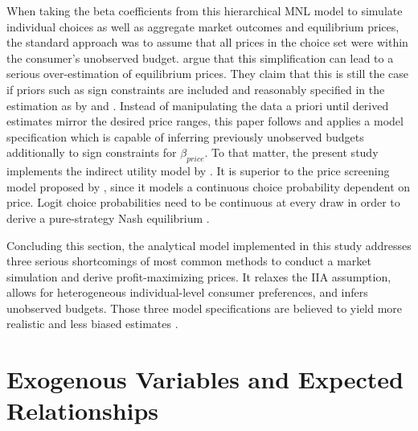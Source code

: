 \documentclass[12pt,a4paper]{article}
\begin{document}
When taking the beta coefficients from this hierarchical MNL model to simulate individual choices as well as aggregate market outcomes and equilibrium prices,
the standard approach was to assume that all prices in the choice set were within the consumer's unobserved budget.
\cite{pachaliPerilsIgnoringBudget2017} argue that this simplification can lead to a serious over-estimation of equilibrium prices.
They claim that this is still the case if priors such as sign constraints are included and reasonably specified in the estimation as by \cite{sonnierHeterogeneityDistributionsWillingnesstopay2007} and \cite{allenbyEconomicValuationProduct2014}.
Instead of manipulating the data a priori until derived estimates mirror the desired price ranges, this paper follows \cite{pachaliPerilsIgnoringBudget2017}
and applies a model specification which is capable of inferring previously unobserved budgets additionally to sign constraints for $\beta_{price}$.
To that matter, the present study implements the indirect utility model by \cite{berryAutomobilePricesMarket1995}.
It is superior to the price screening model proposed by \cite{gilbrideChoiceModelConjunctive2004},
since it models a continuous choice probability dependent on price.
Logit choice probabilities need to be continuous at every draw in order to derive a pure-strategy Nash equilibrium \citep{morrowFixedPointApproachesComputing2011a, pachaliPerilsIgnoringBudget2017}.

Concluding this section, the analytical model implemented in this study addresses three serious shortcomings of most common methods to conduct a market simulation and derive profit-maximizing prices.
It relaxes the IIA assumption, allows for heterogeneous individual-level consumer preferences, and infers unobserved budgets.
Those three model specifications are believed to yield more realistic and less biased estimates \citep{chandukalaChoiceModelsMarketing2008, pachaliPerilsIgnoringBudget2017}.


\section{Exogenous Variables and Expected Relationships} \label{sec_vars_relat}
\end{document}
